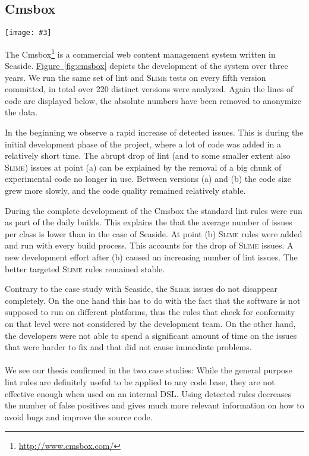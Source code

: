 \documentclass[10pt,twocolumn]{article}
\newcommand{\figtwo}[4]{
	\begin{figure*}[#1]
		\centering
		\texttt{[image: \#3]}
		\caption{\label{fig:#3}#4}
	\end{figure*}}
\newcommand{\Slime}{\textsc{Slime}\xspace}
\newcommand{\Cmsbox}{Cmsbox\xspace}
\newcommand{\Seaside}{Seaside\xspace}
\newcommand{\figref}[1]{\hyperref[fig:#1]{Figure~\ref{fig:#1}}}
\begin{document}
\subsection{\Cmsbox}\label{sec:case-cmsbox}

\figtwo{g!tb}{0.65}{cmsbox}{Average number of Lint and Slime issues per class (above) and lines of code (below) in subsequent development versions of the \Cmsbox.}

The \Cmsbox\footnote{\url{http://www.cmsbox.com/}} is a commercial web content management system written in Seaside. \figref{cmsbox} depicts the development of the system over three years. We run the same set of lint and \Slime tests on every fifth version committed, in total over 220 distinct versions were analyzed. Again the lines of code are displayed below, the absolute numbers have been removed to anonymize the data.

In the beginning we observe a rapid increase of detected issues. This is during the initial development phase of the project, where a lot of code was added in a relatively short time. The abrupt drop of lint (and to some smaller extent also \Slime) issues at point (a) can be explained by the removal of a big chunk of experimental code no longer in use. Between versions (a) and (b) the code size grew more slowly, and the code quality remained relatively stable.

During the complete development of the \Cmsbox the standard lint rules were run as part of the daily builds. This explains the that the average number of issues per class is lower than in the case of \Seaside. At point (b) \Slime rules were added and run with every build process. This accounts for the drop of \Slime issues. A new development effort after (b) caused an increasing number of lint issues. The better targeted \Slime rules remained stable.

Contrary to the case study with \Seaside, the \Slime issues do not disappear completely. On the one hand this has to do with the fact that the software is not supposed to run on different platforms, thus the rules that check for conformity on that level were not considered by the development team. On the other hand, the developers were not able to spend a significant amount of time on the issues that were harder to fix and that did not cause immediate problems.

\paragraph{} We see our thesis confirmed in the two case studies: While the general purpose lint rules are definitely useful to be applied to any code base, they are not effective enough when used on an internal DSL. Using detected rules decreases the number of false positives and gives much more relevant information on how to avoid bugs and improve the source code.
\end{document}
